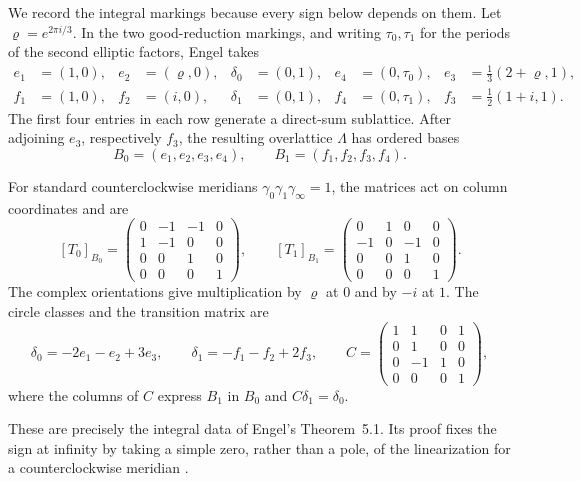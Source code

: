 \documentclass[11pt]{article}
\numberwithin{equation}{section}
\begin{document}
We record the integral markings because every sign below depends on them.
Let $\varrho=e^{2\pi i/3}$.  In the two good-reduction markings, and writing
$\tau_0,\tau_1$ for the periods of the second elliptic factors, Engel takes
\[
\begin{aligned}
 e_1&=(1,0),& e_2&=(\varrho,0),& \delta_0&=(0,1),&e_4&=(0,\tau_0),
 &e_3&=\tfrac13(2+\varrho,1),\\
 f_1&=(1,0),& f_2&=(i,0),& \delta_1&=(0,1),&f_4&=(0,\tau_1),
 &f_3&=\tfrac12(1+i,1).
\end{aligned}                                                   \tag{1.3}
\]
The first four entries in each row generate a direct-sum sublattice. After
adjoining $e_3$, respectively $f_3$, the resulting overlattice $\Lambda$ has
ordered bases
\[
             B_0=(e_1,e_2,e_3,e_4),\qquad
             B_1=(f_1,f_2,f_3,f_4).
\]

For standard counterclockwise meridians
$\gamma_0\gamma_1\gamma_\infty=1$, the matrices act on column coordinates
and are
\[
 [T_0]_{B_0}=
 \begin{pmatrix}
 0&-1&-1&0\\ 1&-1&0&0\\ 0&0&1&0\\ 0&0&0&1
 \end{pmatrix},\qquad
 [T_1]_{B_1}=
 \begin{pmatrix}
 0&1&0&0\\ -1&0&-1&0\\ 0&0&1&0\\ 0&0&0&1
 \end{pmatrix}.                                                  \tag{1.4}
\]
The complex orientations give multiplication by $\varrho$ at $0$ and by
$-i$ at $1$.  The circle classes and the transition matrix are
\[
 \delta_0=-2e_1-e_2+3e_3,\qquad
 \delta_1=-f_1-f_2+2f_3,\qquad
 C=
 \begin{pmatrix}
 1&1&0&1\\0&1&0&0\\0&-1&1&0\\0&0&0&1
 \end{pmatrix},                                                   \tag{1.5}
\]
where the columns of $C$ express $B_1$ in $B_0$ and
$C\delta_1=\delta_0$.

These are precisely the integral data of
Engel's Theorem~5.1.  Its proof fixes the sign at infinity by taking a
simple zero, rather than a pole, of the linearization for a counterclockwise
meridian \cite[pp.~12--15]{Engel}.
\end{document}
